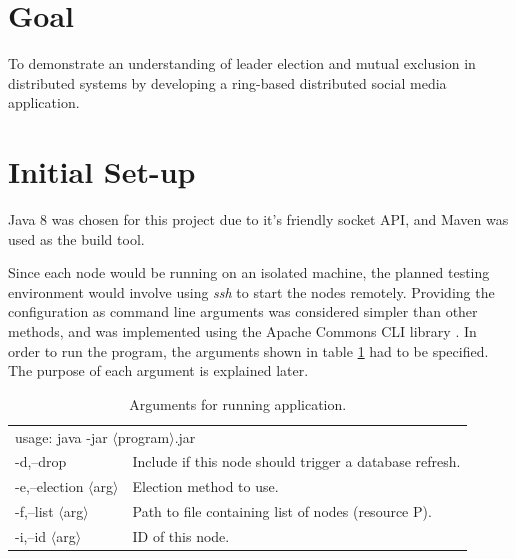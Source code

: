 \documentclass[12pt]{article}
\begin{document}
\begin{titlepage}

\vfill %

\end{titlepage}

\section*{Goal}

To demonstrate an understanding of leader election and mutual exclusion in distributed systems by developing a ring-based distributed social media application.

\tableofcontents
\newpage

\setcounter{page}{1} 

\section{Initial Set-up}

Java 8 was chosen for this project due to it's friendly socket API, and Maven \cite{maven} was used as the build tool. 

Since each node would be running on an isolated machine, the planned testing environment would involve using \emph{ssh} to start the nodes remotely. Providing the configuration as command line arguments was considered simpler than other methods, and was implemented using the Apache Commons CLI library \cite{apachecli}. In order to run the program, the arguments shown in table \ref{tbl:arguments} had to be specified. The purpose of each argument is explained later.

\renewcommand{\arraystretch}{1.5}
\begin{table}[!ht]
\centering
\begin{tabular}{ll}
\multicolumn{2}{l}{usage: java -jar $\langle$program$\rangle$.jar}
\\ 

 -d,--drop           &  Include if this node should trigger a database refresh. \\
 -e,--election $\langle$arg$\rangle$ &  Election method to use. \\
 -f,--list $\langle$arg$\rangle$     &  Path to file containing list of nodes (resource P). \\
 -i,--id $\langle$arg$\rangle$       &  ID of this node. 
\end{tabular}
\caption{Arguments for running application.}
\label{tbl:arguments}
\end{table}
\end{document}
